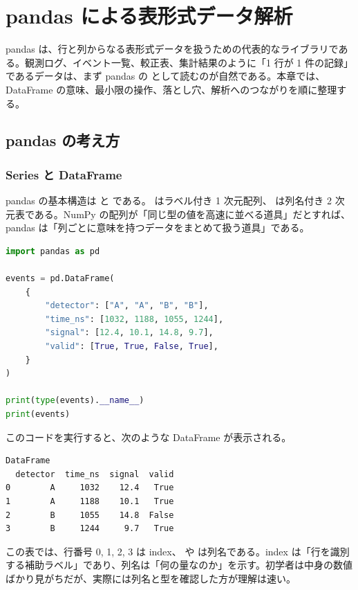\chapter{pandas による表形式データ解析}
\label{chap:pandas}

pandas は、行と列からなる表形式データを扱うための代表的なライブラリである。観測ログ、イベント一覧、較正表、集計結果のように「1 行が 1 件の記録」であるデータは、まず pandas の  として読むのが自然である。本章では、DataFrame の意味、最小限の操作、落とし穴、解析へのつながりを順に整理する。

\section{pandas の考え方}

\subsection{Series と DataFrame}

pandas の基本構造は  と  である。 はラベル付き 1 次元配列、 は列名付き 2 次元表である。NumPy の配列が「同じ型の値を高速に並べる道具」だとすれば、pandas は「列ごとに意味を持つデータをまとめて扱う道具」である。

\begin{lstlisting}[language=Python]
import pandas as pd

events = pd.DataFrame(
    {
        "detector": ["A", "A", "B", "B"],
        "time_ns": [1032, 1188, 1055, 1244],
        "signal": [12.4, 10.1, 14.8, 9.7],
        "valid": [True, True, False, True],
    }
)

print(type(events).__name__)
print(events)
\end{lstlisting}

このコードを実行すると、次のような DataFrame が表示される。

\begin{lstlisting}[numbers=none, xleftmargin=2\zw]
DataFrame
  detector  time_ns  signal  valid
0        A     1032    12.4   True
1        A     1188    10.1   True
2        B     1055    14.8  False
3        B     1244     9.7   True
\end{lstlisting}

この表では、行番号 0, 1, 2, 3 は index、 や  は列名である。index は「行を識別する補助ラベル」であり、列名は「何の量なのか」を示す。初学者は中身の数値ばかり見がちだが、実際には列名と型を確認した方が理解は速い。

